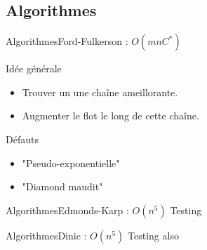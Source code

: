\subsection{Algorithmes}
\begin{frame}{Algorithmes}{Ford-Fulkerson : $O(mnC^*)$}

\begin{block}{Idée générale}
\begin{itemize}
\item Trouver un une chaîne ameillorante.
\item Augmenter le flot le long de cette chaîne.
\end{itemize}
\end{block}

\begin{block}{Défauts}
\begin{itemize}
\item "Pseudo-exponentielle"
\item "Diamond maudit"
\end{itemize}
\end{block}

\end{frame}
\begin{frame}{Algorithmes}{Edmonds-Karp : $O(n^5)$}
Testing
\end{frame}

\begin{frame}{Algorithmes}{Dinic : $O(n^5)$}
Testing also
\end{frame}